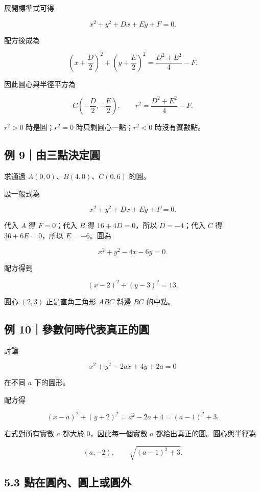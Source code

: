 \documentclass[11pt,a4paper]{article}
\begin{document}
展開標準式可得

\[
x^2+y^2+Dx+Ey+F=0.
\]

配方後成為

\[
\left(x+\frac D2\right)^2+
\left(y+\frac E2\right)^2
=\frac{D^2+E^2}{4}-F.
\]

因此圓心與半徑平方為

\[
\boxed{C\left(-\frac D2,-\frac E2\right)},\qquad
\boxed{r^2=\frac{D^2+E^2}{4}-F}.
\]

\(r^2>0\) 時是圓；\(r^2=0\) 時只剩圓心一點；\(r^2<0\) 時沒有實數點。

\subsection{例 9｜由三點決定圓}\label{ux4f8b-9ux7531ux4e09ux9edeux6c7aux5b9aux5713}

求通過 \(A(0,0)\)、\(B(4,0)\)、\(C(0,6)\) 的圓。

設一般式為

\[
x^2+y^2+Dx+Ey+F=0.
\]

代入 \(A\) 得 \(F=0\)；代入 \(B\) 得 \(16+4D=0\)，所以 \(D=-4\)；代入 \(C\) 得 \(36+6E=0\)，所以 \(E=-6\)。圓為

\[
x^2+y^2-4x-6y=0.
\]

配方得到

\[
\boxed{(x-2)^2+(y-3)^2=13}.
\]

圓心 \((2,3)\) 正是直角三角形 \(ABC\) 斜邊 \(BC\) 的中點。

\subsection{例 10｜參數何時代表真正的圓}\label{ux4f8b-10ux53c3ux6578ux4f55ux6642ux4ee3ux8868ux771fux6b63ux7684ux5713}

討論

\[
x^2+y^2-2ax+4y+2a=0
\]

在不同 \(a\) 下的圖形。

配方得

\[
(x-a)^2+(y+2)^2=a^2-2a+4=(a-1)^2+3.
\]

右式對所有實數 \(a\) 都大於 \(0\)，因此每一個實數 \(a\) 都給出真正的圓。圓心與半徑為

\[
\boxed{(a,-2)},\qquad
\boxed{\sqrt{(a-1)^2+3}}.
\]

\subsection{5.3 點在圓內、圓上或圓外}\label{ux9edeux5728ux5713ux5167ux5713ux4e0aux6216ux5713ux5916}
\end{document}
